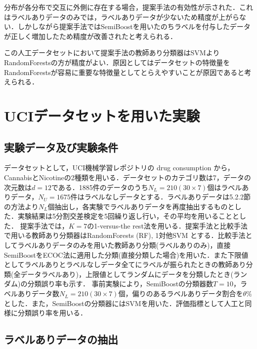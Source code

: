 分布が各分布で交互に外側に存在する場合，提案手法の有効性が示された．これはラベルありデータのみでは，ラベルありデータが少ないため精度が上がらない．しかしながら提案手法ではSemiBoostを用いたのちラベルを付与したデータが正しく増加したため精度が改善されたと考えられる．\par
この人工データセットにおいて提案手法の教師あり分類器はSVMよりRandomForestsの方が精度がよい．原因としてはデータセットの特徴量をRandomForestsが容易に重要な特徴量としてとらえやすいことが原因であると考えられる．

\section{UCIデータセットを用いた実験}
\subsection{実験データ及び実験条件}
\label{sec:実験条件}

データセットとして，UCI機械学習レポジトリ\cite{UCI}の drug consumption から，CannabisとNicotineの2種類を用いる．データセットのカテゴリ数は7，データの次元数は$d = 12$である．1885件のデータのうち$N_L=210(30×7)$個はラベルありデータ，$N_U=1675$件はラベルなしデータとする．ラベルありデータは5.2.2節の方法より$N_L$個抽出し，各実験でラベルありデータを再度抽出するものとした．実験結果は5分割交差検定を5回繰り返し行い，その平均を用いることとした．
提案手法では，$K=7$の1-versus-the rest法を用いる．提案手法と比較手法で用いる教師あり分類器はRandomForests (RF), 1対他SVM とする．比較手法としてラベルありデータのみを用いた教師あり分類(ラベルありのみ)，直接SemiBoostをECOC法に適用した分類(直接分類した場合)を用いた．また下限値としてラベルありとラベルなしデータ全てにラベルが振られたときの教師あり分類(全データラベルあり)，上限値としてランダムにデータを分類したとき(ランダム)の分類誤り率も示す．
事前実験により，SemiBoostの分類器数$T=10$，ラベルありデータ数$N_L=210 (30\times7)$個，偏りのあるラベルありデータ割合を$\theta\%$とした．また，SemiBoostの分類器にはSVMを用いた．評価指標として人工と同様に分類誤り率を用いる．


\subsection{ラベルありデータの抽出}
\label{sec:ラベルありデータの抽出}

